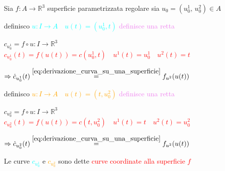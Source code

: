         \begin{esempio}
        Sia $f \colon A \to \mathbb{R}^3$ superficie parametrizzata regolare sia \textcolor{blu}{$u_0 = \left(u_0^1, \, u_0^2\right) \in A$}

        definisco \textcolor{cyan}{$u \colon I \to A \quad u(t)=(u_0^1, t)$} \textcolor{violet}{definisce una retta}  
        
        $ c_{u_0^1} = f \circ u \colon I \to \mathbb{R}^3 \quad$ \textcolor{red}{$c_{u_0^1}(t) = f(u(t))=c(u_0^1, t) \quad u^1(t)=u_0^1 \quad u^2(t)=t$}

        $\Rightarrow \dot{c}_{u_0^1}(t) \overset{\eqref{eq:derivazione_curva_su_una_superficie}}{=} f_{u^2}(u(t))$

        definisco \textcolor{orange}{$u \colon I \to A \quad u(t)=(t, u_0^2)$}  \textcolor{violet}{definisce una retta}
        
        $c_{u_0^2} = f \circ u \colon I \to \mathbb{R}^3 \quad$ \textcolor{red}{$c_{u_0^2}(t) = f(u(t))=c(t, u_0^2) \quad u^1(t)=t \quad u^2(t)=u_0^2$}

        $\Rightarrow \dot{c}_{u_0^2}(t) \overset{\eqref{eq:derivazione_curva_su_una_superficie}}{=} f_{u^2}(u(t))$  

        Le curve \textcolor{cyan}{$c_{u_0^1}$} e \textcolor{orange}{$c_{u_0^2}$} sono dette \textcolor{red}{curve coordinate alla superficie $f$}

        \begin{center}
\end{center}
\end{esempio}
